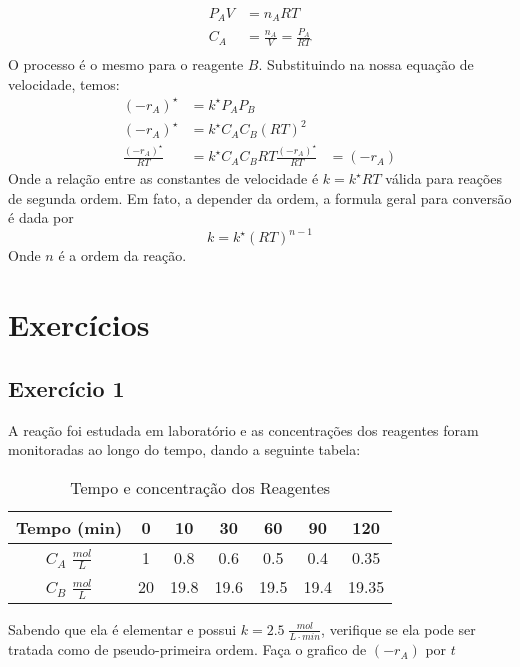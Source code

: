 \begin{align}
    P_A V &= n_A R T \\
    C_A &= \frac{n_A}{V} =  \frac{P_A}{RT} \\
\end{align}
O processo é o mesmo para o reagente \(B\). Substituindo na nossa equação de velocidade, temos:
\begin{align}
    \left( -r_A \right)^{\star} &= k^{\star} P_A P_B \\
    \left( -r_A \right)^{\star} &= k^{\star} C_A C_B \left( RT \right)^2 \\
    \frac{\left( -r_A \right)^{\star}}{RT} &= k^{\star} C_A C_B RT
    \frac{\left( -r_A \right)^{\star}  }{RT} &= \left( -r_A \right) 
\end{align}
Onde a relação entre as constantes de velocidade é \(k = k^{\star} RT\) válida para reações de
segunda ordem. Em fato, a depender da ordem, a formula geral para conversão é dada por
\begin{equation}
    k = k^{\star} \left( RT \right)^{n-1}
\end{equation}
Onde \(n\) é a ordem da reação. \par
\section{Exercícios}
\subsection{Exercício 1}
A reação  foi estudada em laboratório e as concentrações dos reagentes foram
monitoradas ao longo do tempo, dando a seguinte tabela:
\begin{table}[H]
\centering
\begin{tabular}{c|c|c|c|c|c|c}
\toprule
Tempo (min) & 0 & 10 & 30 & 60 & 90 &  120 \\
 \midrule
 \(C_A\) \(\frac{mol}{L}\)  & 1 & 0.8 & 0.6 & 0.5 & 0.4 &  0.35 \\
 \(C_B\) \(\frac{mol}{L}\)  & 20 & 19.8 & 19.6 & 19.5 & 19.4 &  19.35 \\
\bottomrule
\end{tabular}
\caption{Tempo e concentração dos Reagentes}
\label{tab:cap2_ex1_tabela}
\end{table}
Sabendo que ela é elementar e possui \(k = 2.5 \; \frac{mol}{L \cdot  min}\), verifique se ela pode
ser tratada como de pseudo-primeira ordem. Faça o grafico de \(\left( -r_A \right) \) por \(t\)
